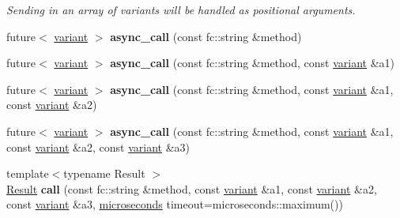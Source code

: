 \begin{Indent}
\begin{DoxyCompactItemize}
\begin{DoxyCompactList}\small\item\em Sending in an array of variants will be handled as positional arguments. \end{DoxyCompactList}\item 
\mbox{\label{classfc_1_1rpc_1_1variant__connection_a323ef158f0775088a4c37950624a3242}} 
future$<$ \mbox{\hyperlink{classfc_1_1variant}{variant}} $>$ {\bfseries async\+\_\+call} (const fc\+::string \&method)
\item 
\mbox{\label{classfc_1_1rpc_1_1variant__connection_a14c4341e0d058a54b1d417ab2f44477c}} 
future$<$ \mbox{\hyperlink{classfc_1_1variant}{variant}} $>$ {\bfseries async\+\_\+call} (const fc\+::string \&method, const \mbox{\hyperlink{classfc_1_1variant}{variant}} \&a1)
\item 
\mbox{\label{classfc_1_1rpc_1_1variant__connection_ab5ec63158dc8b9932325a19abc1954c5}} 
future$<$ \mbox{\hyperlink{classfc_1_1variant}{variant}} $>$ {\bfseries async\+\_\+call} (const fc\+::string \&method, const \mbox{\hyperlink{classfc_1_1variant}{variant}} \&a1, const \mbox{\hyperlink{classfc_1_1variant}{variant}} \&a2)
\item 
\mbox{\label{classfc_1_1rpc_1_1variant__connection_a24a5dc47a6ec7ed56c7967d165b062c9}} 
future$<$ \mbox{\hyperlink{classfc_1_1variant}{variant}} $>$ {\bfseries async\+\_\+call} (const fc\+::string \&method, const \mbox{\hyperlink{classfc_1_1variant}{variant}} \&a1, const \mbox{\hyperlink{classfc_1_1variant}{variant}} \&a2, const \mbox{\hyperlink{classfc_1_1variant}{variant}} \&a3)
\item 
\mbox{\label{classfc_1_1rpc_1_1variant__connection_ad040549bb431b6495ee4b49e2048f295}} 
{\footnotesize template$<$typename Result $>$ }\\\mbox{\hyperlink{struct_result}{Result}} {\bfseries call} (const fc\+::string \&method, const \mbox{\hyperlink{classfc_1_1variant}{variant}} \&a1, const \mbox{\hyperlink{classfc_1_1variant}{variant}} \&a2, const \mbox{\hyperlink{classfc_1_1variant}{variant}} \&a3, \mbox{\hyperlink{classfc_1_1microseconds}{microseconds}} timeout=microseconds\+::maximum())

\end{DoxyCompactItemize}
\end{Indent}
